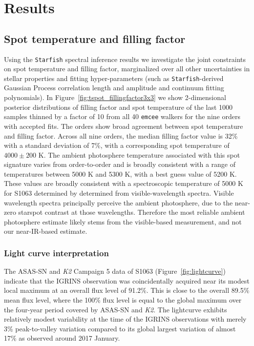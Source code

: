 \documentclass[trackchanges]{aastex631}
\begin{document}




\section{Results}
\label{sec:results}

\subsection{Spot temperature and filling factor}
\label{sec:starfishresults}
Using the \texttt{Starfish} spectral inference results we investigate the joint constraints on spot temperature and filling factor, marginalized over all other uncertainties in stellar properties and fitting hyper-parameters (such as \texttt{Starfish}-derived Gaussian Process correlation length and amplitude and continuum fitting polynomials). In Figure~\ref{fig:tspot_fillingfactor3x3} we show 2-dimensional posterior distributions of filling factor and spot temperature of the last 1000 samples thinned by a factor of 10 from all 40 \texttt{emcee} walkers for the nine orders with accepted fits. The orders show broad agreement between spot temperature and filling factor. Across all nine orders, the median filling factor value is 32\% with a standard deviation of 7\%, with a corresponding spot temperature of $4000 \pm 200$ K. The ambient photosphere temperature associated with this spot signature varies from order-to-order and is broadly consistent with a range of temperatures between 5000 K and 5300 K, with a best guess value of 5200 K.  These values are broadly consistent with a spectroscopic temperature of 5000 K for S1063 determined by \citet{mathieu03} determined from visible-wavelength spectra.  Visible wavelength spectra principally perceive the ambient photosphere, due to the near-zero starspot contrast at those wavelengths.  Therefore the most reliable ambient photosphere estimate likely stems from the visible-based measurement, and not our near-IR-based estimate.

\subsubsection{Light curve interpretation}
The ASAS-SN and \textit{K2} Campaign 5 data of S1063 (Figure~\ref{fig:lightcurve}) indicate that the IGRINS observation was coincidentally acquired near its modest local maximum at an overall flux level of 91.2\%. This is close to the overall 89.5\% mean flux level, where the 100\% flux level is equal to the global maximum over the four-year period covered by ASAS-SN and \textit{K2}. The lightcurve exhibits relatively modest variability at the time of the IGRINS observations with merely 3\% peak-to-valley variation compared to its global largest variation of almost 17\% as observed around 2017 January.
\end{document}
